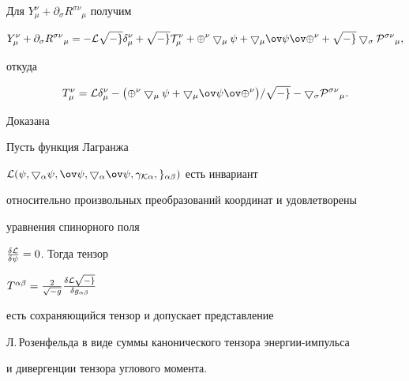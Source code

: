 Для $Y^\nu_\mu+\partial_\sigma R^{\sigma\nu}{}_\mu$ получим


$$


Y^\nu_\mu+\partial_\sigma R^{\sigma\nu}{}_\mu=-\cal L\sqrt{-g}


\delta^\nu_\mu+\sqrt{-g}T^\nu_\mu+


\Phi^\nu\bigtriangledown_\mu\psi+\bigtriangledown_\mu


\ov\psi\ov\Phi^\nu+\sqrt{-g}


\bigtriangledown_\sigma P^{\sigma\nu}{}_\mu,


$$


откуда


$$


T^\nu_\mu=\cal L\delta^\nu_\mu-


\big(\Phi^\nu\bigtriangledown_\mu\psi+\bigtriangledown_\mu


\ov\psi\ov\Phi^\nu\big)/\sqrt{-g}-


\bigtriangledown_\sigma P^{\sigma\nu}{}_\mu.


$$





Доказана





\begin{thm}


Пусть функция Лагранжа


$\cal L(\psi,\bigtriangledown_\alpha\psi, \ov\psi,


\bigtriangledown_\alpha\ov\psi, \gamma_{K\alpha},


g_{\alpha\beta})$ есть инвариант


относительно произвольных преобразований координат и удовлетворены


уравнения спинорного поля


$\frac{\delta\cal L}{\delta\psi}=0$. Тогда тензор


$T^{\alpha\beta}=\frac{2}{\sqrt{-g}}\frac{\delta\cal L


\sqrt{-g}}{\delta g_{\alpha\beta}}$


есть сохраняющийся тензор и допускает представление


Л.\,Розенфельда в виде суммы канонического тензора энергии-импульса 


и дивергенции тензора углового момента.


\end{thm}





